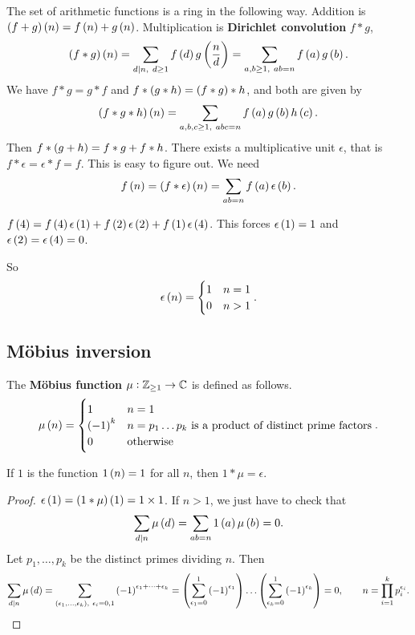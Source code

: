 The set of arithmetic functions is a ring in the following way. Addition is $ \br{f + g}\br{n} = f\br{n} + g\br{n} $. Multiplication is \textbf{Dirichlet convolution} $ f * g $,
$$ \br{f * g}\br{n} = \sum_{d \mid n, \ d \ge 1} f\br{d}g\br{\dfrac{n}{d}} = \sum_{a, b \ge 1, \ ab = n} f\br{a}g\br{b}. $$
We have $ f * g = g * f $ and $ f * \br{g * h} = \br{f * g} * h $, and both are given by
$$ \br{f * g * h}\br{n} = \sum_{a, b, c \ge 1, \ abc = n} f\br{a}g\br{b}h\br{c}. $$
Then $ f * \br{g + h} = f * g + f * h $. There exists a multiplicative unit $ \epsilon $, that is $ f * \epsilon = \epsilon * f = f $. This is easy to figure out. We need
$$ f\br{n} = \br{f * \epsilon}\br{n} = \sum_{ab = n} f\br{a}\epsilon\br{b}. $$

\begin{example*}
$ f\br{4} = f\br{4}\epsilon\br{1} + f\br{2}\epsilon\br{2} + f\br{1}\epsilon\br{4} $. This forces $ \epsilon\br{1} = 1 $ and $ \epsilon\br{2} = \epsilon\br{4} = 0 $.
\end{example*}

So
$$ \epsilon\br{n} =
\begin{cases}
1 & n = 1 \\
0 & n > 1
\end{cases}.
$$

\subsection{M\"obius inversion}

The \textbf{M\"obius function} $ \mu : \mathbb{Z}_{\ge 1} \to \mathbb{C} $ is defined as follows.
$$ \mu\br{n} =
\begin{cases}
1 & n = 1 \\
\br{-1}^k & n = p_1 \dots p_k \ \text{is a product of distinct prime factors} \\
0 & \text{otherwise}
\end{cases}.
$$

\begin{lemma}
\label{lem:103}
If $ 1 $ is the function $ 1\br{n} = 1 $ for all $ n $, then $ 1 * \mu = \epsilon $.
\end{lemma}

\begin{proof}
$ \epsilon\br{1} = \br{1 * \mu}\br{1} = 1 \times 1 $. If $ n > 1 $, we just have to check that
$$ \sum_{d \mid n} \mu\br{d} = \sum_{ab = n} 1\br{a}\mu\br{b} = 0. $$
Let $ p_1, \dots, p_k $ be the distinct primes dividing $ n $. Then
$$ \sum_{d \mid n} \mu\br{d} = \sum_{\br{\epsilon_1, \dots, \epsilon_k}, \ \epsilon_i = 0, 1} \br{-1}^{\epsilon_1 + \dots + \epsilon_k} = \br{\sum_{\epsilon_1 = 0}^1 \br{-1}^{\epsilon_1}} \dots \br{\sum_{\epsilon_k = 0}^1 \br{-1}^{\epsilon_k}} = 0, \qquad n = \prod_{i = 1}^k p_i^{\epsilon_i}. $$
\end{proof}


